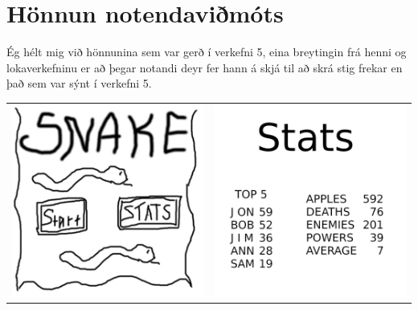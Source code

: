 \documentclass[a4paper]{paper}
\begin{document}
\section{Hönnun notendaviðmóts}
Ég hélt mig við hönnunina sem var gerð í verkefni 5, 
eina breytingin frá henni og lokaverkefninu er að þegar notandi deyr fer hann á skjá til að skrá stig frekar en það sem var sýnt í verkefni 5.
\begin{center}
    \begin{tabular}{c c}
        \includegraphics[scale=0.5]{imgs/m1.png}&
        \includegraphics[scale=0.5]{imgs/m2.png}\\

\end{tabular}
\end{center}
\end{document}
